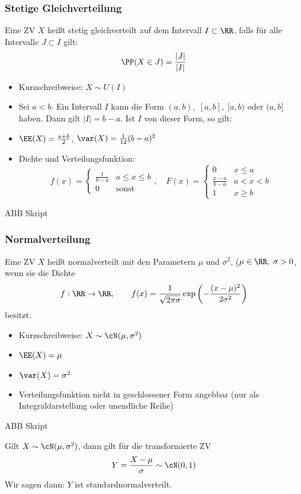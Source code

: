 \subsubsection{Stetige Gleichverteilung}
 Eine ZV $X$ heißt stetig gleichverteilt auf dem Intervall $I\subset \RR$, falls für alle Intervalle $J \subset I$ gilt:
$$\PP(X\in J)=\frac{|J|}{|I|}$$
\begin{itemize}
\item Kurzschreibweise: $X \sim U(I)$
\item Sei $a<b$. Ein Intervall $I$ kann die Form $(a,b),\;[a,b],\;[a,b)$ oder $(a,b]$ haben. Dann gilt $|I|=b-a$. Ist $I$ von dieser Form, so gilt:
\item $\EE(X)=\frac{a+b}{2}$, $\var(X)=\frac{1}{12}(b-a)^2$
\item Dichte und Verteilungsfunktion:
$$f(x)=\begin{cases}
\frac{1}{b-a} & a\leq x \leq b\\
0 & \mathrm{sonst}
\end{cases}, \quad F(x)=\begin{cases}
0 & x \leq a\\
\frac{x-a}{b-a} & a<x<b\\
1 & x \geq b
\end{cases}$$
\end{itemize}
ABB Skript
\subsubsection{Normalverteilung}
 Eine ZV $X$ heißt normalverteilt mit den Parametern $\mu$ und $\sigma^2$, ($\mu \in \RR, \; \sigma > 0$, wenn sie die Dichte
$$f: \RR\to \RR, \qquad f(x)=\frac{1}{\sqrt{2\pi\sigma}}\exp\left(-\frac{(x-\mu)^2}{2\sigma^2}\right)$$
besitzt.

\begin{itemize}
\item Kurzschreibweise: $X\sim \cN(\mu, \sigma^2)$
\item $\EE(X)=\mu$
\item $\var(X) = \sigma^2$
\item Verteilungsfunktion nicht in geschlossener Form angebbar (nur als Integraldarstellung oder unendliche Reihe)
\end{itemize}
ABB Skript

 Gilt $X\sim \cN(\mu, \sigma^2)$, dann gilt für die transformierte ZV
$$Y=\frac{X-\mu}{\sigma} \sim \cN (0,1)$$
Wir sagen dann: $Y$ ist standardnormalverteilt.

